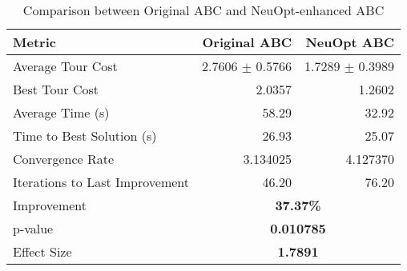 \begin{table}[ht]
\centering
\caption{Comparison between Original ABC and NeuOpt-enhanced ABC}
\begin{tabular}{lrr}
\hline
Metric & Original ABC & NeuOpt ABC \\
\hline
Average Tour Cost & 2.7606 $\pm$ 0.5766 & 1.7289 $\pm$ 0.3989 \\
Best Tour Cost & 2.0357 & 1.2602 \\
Average Time (s) & 58.29 & 32.92 \\
Time to Best Solution (s) & 26.93 & 25.07 \\
Convergence Rate & 3.134025 & 4.127370 \\
Iterations to Last Improvement & 46.20 & 76.20 \\
\hline
Improvement & \multicolumn{2}{c}{\textbf{37.37\%}} \\
p-value & \multicolumn{2}{c}{\textbf{0.010785}} \\
Effect Size & \multicolumn{2}{c}{\textbf{1.7891}} \\
\hline
\end{tabular}
\end{table}
